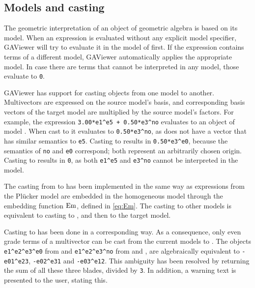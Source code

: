 \subsection{Models and casting}
The geometric interpretation of an object of geometric algebra is based on its model.  When an expression is evaluated without any explicit model specifier, GAViewer will try to evaluate it in the model of \ega{} first.  If the expression contains terms of a different model, GAViewer automatically applies the appropriate model.  In case there are terms that cannot be interpreted in any model, those evaluate to \texttt{0}.

GAViewer has support for casting objects from one model to another.  Multivectors are expressed on the source model's basis, and corresponding basis vectors of the target model are multiplied by the source model's factors.  For example, the expression \texttt{3.00*e1\^{}e5 + 0.50*e3\^{}no} evaluates to an object of model \cbga{}.  When cast to \cga{} it evaluates to \texttt{0.50*e3\^{}no}, as \cga{} does not have a vector that has similar semantics to \texttt{e5}.  Casting to \pga{} results in \texttt{0.50*e3\^{}e0}, because the semantics of \texttt{no} and \texttt{e0} correspond; both represent an arbitrarily chosen origin.  Casting to \ega{} results in \texttt{0}, as both \texttt{e1\^{}e5} and \texttt{e3\^{}no} cannot be interpreted in the model.

The casting from \lga{} to \pga{} has been implemented in the same way as expressions from the Pl\"ucker model are embedded in the homogeneous model through the embedding function $\operatorname{Em}$, defined in \autoref{eq:Em}.  The casting to other models is equivalent to casting to \pga{}, and then to the target model.

Casting to \lga{} has been done in a corresponding way.  As a consequence, only even grade terms of a multivector can be cast from the current models to \lga{}.  The objects \texttt{e1\^{}e2\^{}e3\^{}e0} from \pga{} and \texttt{e1\^{}e2\^{}e3\^{}no} from \cga{} and \cbga{}, are algebraically equivalent to \texttt{-e01\^{}e23}, \texttt{-e02\^{}e31} and \texttt{-e03\^{}e12}.  This ambiguity has been resolved by returning the sum of all these three blades, divided by \texttt{3}.  In addition, a warning text is presented to the user, stating this.

